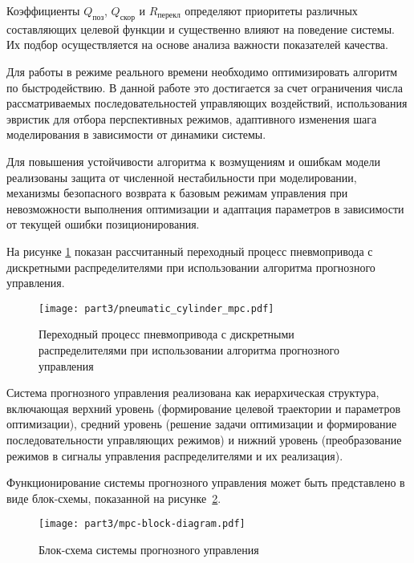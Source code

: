 Коэффициенты $Q_{\text{поз}}$, $Q_{\text{скор}}$ и $R_{\text{перекл}}$ определяют приоритеты
различных составляющих целевой функции и существенно влияют на поведение системы. Их подбор
осуществляется на основе анализа важности показателей качества.

Для работы в режиме реального времени необходимо оптимизировать алгоритм по быстродействию.
В данной работе это достигается за счет ограничения числа рассматриваемых последовательностей
управляющих воздействий, использования эвристик для отбора перспективных режимов,
адаптивного изменения шага моделирования в зависимости от динамики системы.

Для повышения устойчивости алгоритма к возмущениям и ошибкам модели реализованы защита
от численной нестабильности при моделировании, механизмы безопасного возврата к базовым
режимам управления при невозможности выполнения оптимизации и адаптация параметров в зависимости от текущей ошибки позиционирования.

На рисунке \ref{fig:mpc_transient} показан рассчитанный переходный процесс
пневмопривода с дискретными распределителями при использовании алгоритма прогнозного управления.

\begin{figure}[ht]
	\centering
	\texttt{[image: part3/pneumatic\_cylinder\_mpc.pdf]}
	\caption{Переходный процесс пневмопривода с дискретными распределителями при использовании алгоритма прогнозного управления}
	\label{fig:mpc_transient}
\end{figure}

Система прогнозного управления реализована как иерархическая структура,
включающая верхний уровень (формирование целевой траектории и параметров оптимизации),
средний уровень (решение задачи оптимизации и формирование последовательности управляющих режимов) и
нижний уровень (преобразование режимов в сигналы управления распределителями и их реализация).

Функционирование системы прогнозного управления может быть представлено
в виде блок-схемы, показанной на рисунке~\ref{fig:mpc_block_diagram}.

\begin{figure}[h]
	\centering
	\texttt{[image: part3/mpc-block-diagram.pdf]}
	\caption{Блок-схема системы прогнозного управления}
	\label{fig:mpc_block_diagram}
\end{figure}

